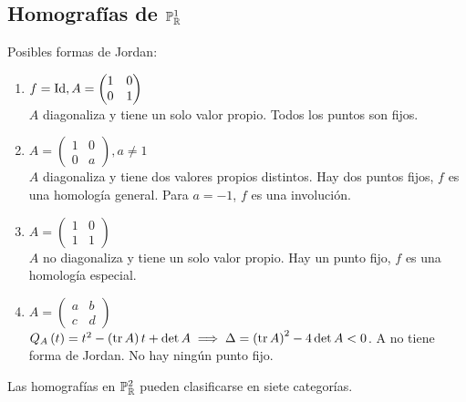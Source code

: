 \subsection{Homografías de $\mathbb{P}_{\mathbb{R}}^1$}
Posibles formas de Jordan:
\begin{enumerate}[(1)]
    \item $f=\operatorname{Id}, A= \begin{pmatrix} 1 & 0 \\ 0 & 1 \end{pmatrix}$ \\
        $A$ diagonaliza y tiene un solo valor propio. Todos los puntos son fijos.
    \item $A= \begin{pmatrix} 1 & 0 \\ 0 & a \end{pmatrix}, a \neq 1$ \\
        $A$ diagonaliza y tiene dos valores propios distintos. Hay dos puntos fijos, $f$ es una homología general. Para $a=-1$, $f$ es una involución.
    \item $A= \begin{pmatrix} 1 & 0 \\ 1 & 1 \end{pmatrix}$ \\
        $A$ no diagonaliza y tiene un solo valor propio. Hay un punto fijo, $f$ es una homología especial.
    \item $A= \begin{pmatrix} a & b \\ c & d \end{pmatrix}$ \\
        $Q_A \left( t \right) = t^2 - \left( \operatorname{tr} A \right) t + \det A \implies \Delta = \left( \operatorname{tr} A \right) ^2 - 4 \det A < 0$. A no tiene forma de Jordan. No hay ningún punto fijo.
\end{enumerate}
\begin{obs}
    Las homografías en $\mathbb{P}_{\mathbb{R}}^2$ pueden clasificarse en siete categorías.
\end{obs}


